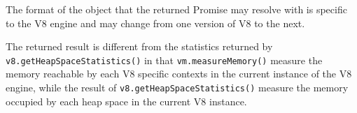 The format of the object that the returned Promise may resolve with is
specific to the V8 engine and may change from one version of V8 to the
next.

The returned result is different from the statistics returned by
\texttt{v8.getHeapSpaceStatistics()} in that \texttt{vm.measureMemory()}
measure the memory reachable by each V8 specific contexts in the current
instance of the V8 engine, while the result of
\texttt{v8.getHeapSpaceStatistics()} measure the memory occupied by each
heap space in the current V8 instance.

\begin{Shaded}
\begin{Highlighting}[]
\OperatorTok{=} \NormalTok{(}\NormalTok{)}\OperatorTok{;}
\NormalTok{(\{ }\OperatorTok{:} \NormalTok{ \})}
  \KeywordTok{=\textgreater{}}\NormalTok{ \{}
    \CommentTok{// \{}
    \CommentTok{//    \}}
    \CommentTok{// \}}
    \OperatorTok{;}
\NormalTok{  \})}\OperatorTok{;}


\end{Highlighting}
\end{Shaded}
